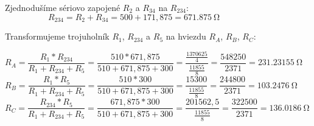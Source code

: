 \begin{figure}[!ht]
\begin{center}
    
    Zjednodušíme sériovo zapojené $R_2$ a $R_{34}$ na $R_{234}$:
    \[ R_{234} = R_2 + R_{34} = 500 + 171,875 = \SI{671,875}{\ohm}\]
    
    Transformujeme trojuholník $R_1$, $R_{234}$ a $R_5$ na hviezdu $R_A$, $R_B$, $R_C$:
    
    \[
        R_A = \frac{R_1 * R_{234}}{R_1 + R_{234} + R_5} = 
        \frac{510 * 671,875}{510 + 671,875 + 300} = 
        \frac{\frac{1370625}{4}}{\frac{11855}{8}} = 
        \frac{548250}{2371} = \SI{231,23155}{\ohm}
    \]
    \[
        R_B = \frac{R_1 * R_5}{R_1 + R_{234} + R_5} = 
        \frac{510 * 300}{510 + 671,875 + 300} = 
        \frac{15300}{\frac{11855}{8}} = 
        \frac{244800}{2371} = \SI{103,2476}{\ohm}
    \]
    \[
        R_C = \frac{R_{234} * R_5}{R_1 + R_{234} + R_5} = 
        \frac{671,875 * 300}{510 + 671,875 + 300} = 
        \frac{201562,5}{\frac{11855}{8}} = 
        \frac{322500}{2371} = \SI{136,0186}{\ohm}
    \]
\end{center}
\end{figure}
